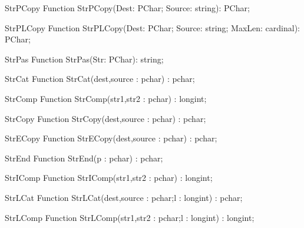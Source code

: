 
\begin{function}{StrPCopy}
\Declaration
Function StrPCopy(Dest: PChar; Source: string): PChar;
\Description
\Errors
\SeeAlso
\end{function}

 
\begin{function}{StrPLCopy}
\Declaration
Function StrPLCopy(Dest: PChar; Source: string; MaxLen: cardinal): PChar;
\Description
\Errors
\SeeAlso
\end{function}

 
\begin{function}{StrPas}
\Declaration
Function StrPas(Str: PChar): string;
\Description
\Errors
\SeeAlso
\end{function}

 
\begin{function}{StrCat}
\Declaration
Function StrCat(dest,source : pchar) : pchar;
\Description
\Errors
\SeeAlso
\end{function}

 
\begin{function}{StrComp}
\Declaration
Function StrComp(str1,str2 : pchar) : longint;
\Description
\Errors
\SeeAlso
\end{function}

 
\begin{function}{StrCopy}
\Declaration
Function StrCopy(dest,source : pchar) : pchar;
\Description
\Errors
\SeeAlso
\end{function}

 
\begin{function}{StrECopy}
\Declaration
Function StrECopy(dest,source : pchar) : pchar;
\Description
\Errors
\SeeAlso
\end{function}

 
\begin{function}{StrEnd}
\Declaration
Function StrEnd(p : pchar) : pchar;
\Description
\Errors
\SeeAlso
\end{function}

 
\begin{function}{StrIComp}
\Declaration
Function StrIComp(str1,str2 : pchar) : longint;
\Description
\Errors
\SeeAlso
\end{function}

 
\begin{function}{StrLCat}
\Declaration
Function StrLCat(dest,source : pchar;l : longint) : pchar;
\Description
\Errors
\SeeAlso
\end{function}

 
\begin{function}{StrLComp}
\Declaration
Function StrLComp(str1,str2 : pchar;l : longint) : longint;
\Description
\Errors
\SeeAlso
\end{function}

